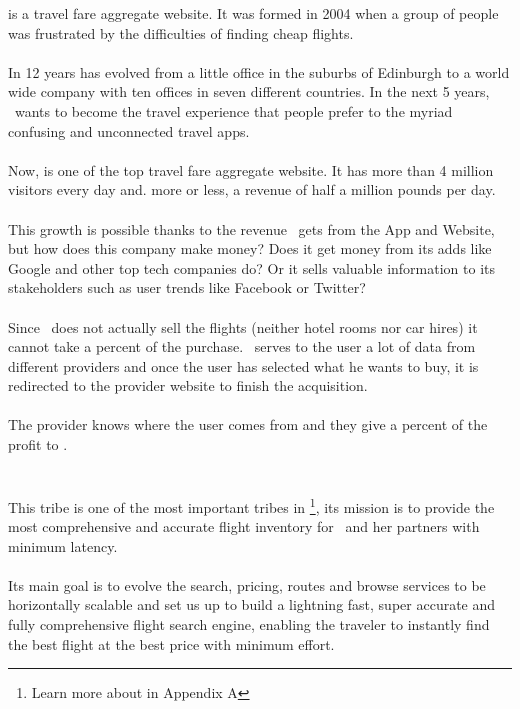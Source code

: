 \company\cite{skyscanner_strategy} is a travel fare aggregate website. It was formed in 2004 when a group of people was frustrated by the difficulties of finding cheap flights.
\\\\
In 12 years has evolved from a little office in the suburbs of Edinburgh to a world wide company with ten offices in seven different countries. In the next 5 years, \company\ wants to become the travel experience that people prefer to the myriad confusing and unconnected travel apps.
\\\\
Now, is one of the top travel fare aggregate website. It has more than 4 million visitors every day and. more or less, a revenue of half a million pounds per day.
\\\\
This growth is possible thanks to the revenue \company\ gets from the App and Website, but how does this company make money? Does it get money from its adds like Google and other top tech companies do? Or it sells valuable information to its stakeholders such as user trends like Facebook or Twitter?
\\\\
Since \company\ does not actually sell the flights (neither hotel rooms nor car hires) it cannot take a percent of the purchase. \company\ serves to the user a lot of data from different providers and once the user has selected what he wants to buy, it is redirected to the provider website to finish the acquisition.
\\\\
The provider knows where the user comes from and they give a percent of the profit to \company.


\section{\tribe}

This tribe\cite{marketplace_engine_home} is one of the most important tribes in \company\footnote{Learn more about \textit{} in Appendix A}, its mission is to provide the most comprehensive and accurate flight inventory for \company\ and her partners with minimum latency.
\\\\
Its main goal is to evolve the search, pricing, routes and browse services to be horizontally scalable and set us up to build a lightning fast, super accurate and fully comprehensive flight search engine, enabling the traveler to instantly find the best flight at the best price with minimum effort.


